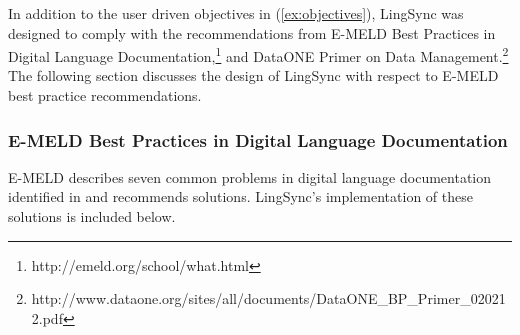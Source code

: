 \documentclass[letterpaper, 12pt, dvips]{mitwpl}
\begin{document}
In addition to the user driven objectives in (\ref{ex:objectives}), LingSync was designed to comply with the recommendations from %
E-MELD Best Practices in Digital Language Documentation,\footnote{http://emeld.org/school/what.html} and %
DataONE Primer on Data Management.\footnote{http://www.dataone.org/sites/all/documents/DataONE\_BP\_Primer\_020212.pdf}
The following section discusses the design of LingSync with respect to E-MELD %
best practice recommendations. 


\subsubsection{E-MELD Best Practices in Digital Language Documentation}
\label{sec:documentation} 

E-MELD describes seven common problems in digital language documentation identified in \cite{Bird:2003} and recommends solutions. LingSync's implementation of these solutions is included below.
\end{document}
